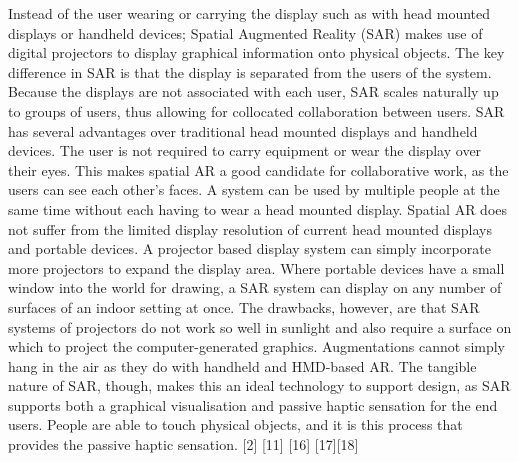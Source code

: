 Instead of the user wearing or carrying the display such as with head mounted displays or handheld devices; Spatial Augmented Reality (SAR) makes use of digital projectors to display graphical information onto physical objects. The key difference in SAR is that the display is separated from the users of the system. Because the displays are not associated with each user, SAR scales naturally up to groups of users, thus allowing for collocated collaboration between users. SAR has several advantages over traditional head mounted displays and handheld devices. The user is not required to carry equipment or wear the display over their eyes. This makes spatial AR a good candidate for collaborative work, as the users can see each other’s faces. A system can be used by multiple people at the same time without each having to wear a head mounted display. Spatial AR does not suffer from the limited display resolution of current head mounted displays and portable devices. A projector based display system can simply incorporate more projectors to expand the display area. Where portable devices have a small window into the world for drawing, a SAR system can display on any number of surfaces of an indoor setting at once. The drawbacks, however, are that SAR systems of projectors do not work so well in sunlight and also require a surface on which to project the computer-generated graphics. Augmentations cannot simply hang in the air as they do with handheld and HMD-based AR. The tangible nature of SAR, though, makes this an ideal technology to support design, as SAR supports both a graphical visualisation and passive haptic sensation for the end users. People are able to touch physical objects, and it is this process that provides the passive haptic sensation. [2] [11] [16] [17][18]